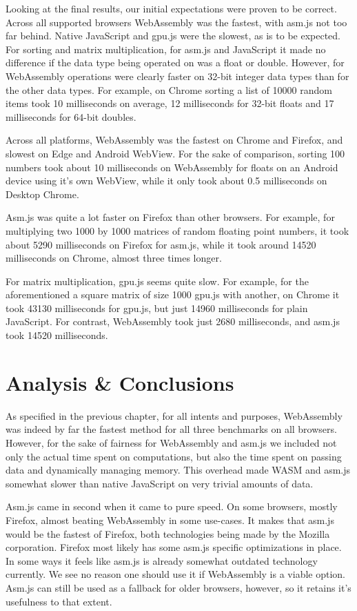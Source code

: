 \documentclass[conference]{IEEEtran}
\begin{document}
Looking at the final results, our initial expectations were proven to be
correct. Across all supported browsers WebAssembly was the fastest, with asm.js
not too far behind. Native JavaScript and gpu.js were the slowest, as is to be
expected. For sorting and matrix multiplication, for asm.js and JavaScript it
made no difference if the data type being operated on was a float or double.
However, for WebAssembly operations were clearly faster on 32-bit integer data
types than for the other data types. For example, on Chrome sorting a list of
10000 random items took 10 milliseconds on average, 12 milliseconds for 32-bit
floats and 17 milliseconds for 64-bit doubles.

Across all platforms, WebAssembly was the fastest on Chrome and Firefox, and
slowest on Edge and Android WebView. For the sake of comparison, sorting 100
numbers took about 10 milliseconds on WebAssembly for floats on an Android
device using it's own WebView, while it only took about 0.5 milliseconds on
Desktop Chrome.

Asm.js was quite a lot faster on Firefox than other browsers. For example, for
multiplying two 1000 by 1000 matrices of random floating point numbers, it took
about 5290 milliseconds on Firefox for asm.js, while it took around 14520
milliseconds on Chrome, almost three times longer.

For matrix multiplication, gpu.js seems quite slow. For example, for the aforementioned a square
matrix of size 1000  gpu.js with another, on Chrome it took 43130
milliseconds for gpu.js, but just 14960 milliseconds for plain JavaScript. For
contrast, WebAssembly took just 2680 milliseconds, and asm.js took 14520
milliseconds.

\section{Analysis \& Conclusions}
As specified in the previous chapter, for all intents and purposes,
WebAssembly was indeed by far the fastest method for all three benchmarks on
all browsers. However, for the sake of fairness for WebAssembly and asm.js we
included not only the actual time spent on computations, but also the time
spent on passing data and dynamically managing memory. This overhead made WASM
and asm.js somewhat slower than native JavaScript on very trivial amounts of
data.

Asm.js came in second when it came to pure speed. On some browsers, mostly
Firefox, almost beating WebAssembly in some use-cases. It makes that asm.js
would be the fastest of Firefox, both technologies being made by the Mozilla
corporation. Firefox most likely has some asm.js specific optimizations in
place. In some ways it feels like asm.js is already somewhat outdated
technology currently. We see no reason one should use it if WebAssembly is a
viable option. Asm.js can still be used as a fallback for older browsers,
however, so it retains it's usefulness to that extent.
\end{document}
